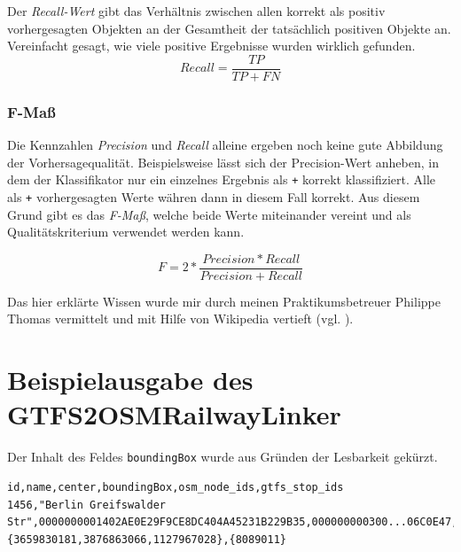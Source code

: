 Der \textit{Recall-Wert} gibt das Verhältnis zwischen allen korrekt als positiv vorhergesagten Objekten an der Gesamtheit der tatsächlich positiven Objekte an. Vereinfacht gesagt, wie viele positive Ergebnisse wurden wirklich gefunden.
$$Recall = \frac{TP}{TP + FN}$$

\subsubsection{F-Maß}

Die Kennzahlen \textit{Precision} und \textit{Recall} alleine ergeben noch keine gute Abbildung der Vorhersagequalität.
Beispielsweise lässt sich der Precision-Wert anheben, in dem der Klassifikator nur ein einzelnes Ergebnis als \texttt{+} korrekt klassifiziert.
Alle als \texttt{+} vorhergesagten Werte währen dann in diesem Fall korrekt.
Aus diesem Grund gibt es das \textit{F-Maß}, welche beide Werte miteinander vereint und als Qualitätskriterium verwendet werden kann.

$$F = 2 * \frac{Precision * Recall}{Precision + Recall}$$

Das hier erklärte Wissen wurde mir durch meinen Praktikumsbetreuer Philippe Thomas vermittelt und mit Hilfe von Wikipedia vertieft (vgl. \cite{ wiki:fmeasure}).

\section{Beispielausgabe des GTFS2OSMRailwayLinker}
\label{sec:appendix:gtfs2osm_example}
Der Inhalt des Feldes \texttt{boundingBox} wurde aus Gründen der Lesbarkeit gekürzt.
\lstset{
  language=,
  numbers=left,
  caption=Ausgabe des GTFS2OSMRailwayLinker,
  label=,
}
\begin{lstlisting}
id,name,center,boundingBox,osm_node_ids,gtfs_stop_ids
1456,"Berlin Greifswalder Str",0000000001402AE0E29F9CE8DC404A45231B229B35,000000000300...06C0E47,{3659830181,3876863066,1127967028},{8089011}
\end{lstlisting}

